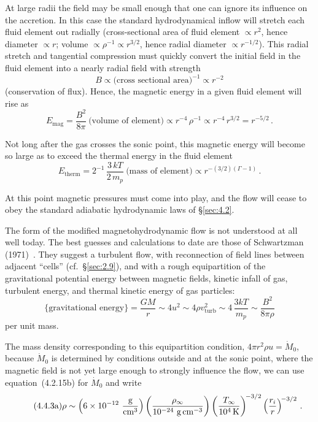 At large radii the field may be small enough that one can ignore its influence on
the accretion.  In this case the standard hydrodynamical inflow will stretch each
fluid element out radially (cross-sectional area of fluid element $\propto r^2$, hence
diameter $\propto r$; volume $\propto \rho^{-1} \propto r^{3/2}$, hence radial diameter $\propto r^{-1/2}$).
This radial stretch and tangential compression must quickly convert the initial
field in the fluid element into a nearly radial field with strength
%
\begin{equation}
\tag{4.4.2}
B \propto \text{(cross sectional area)}^{-1} \propto r^{-2}
\end{equation}
%
(conservation of flux).  Hence, the magnetic energy in a given fluid element will
rise as
%
\begin{equation}
\tag{4.4.3}
E_{\mathrm{mag}}
= \frac{B^2}{8\pi}~\text{(volume of element)}
\propto r^{-4}\,\rho^{-1}
\propto r^{-4}\,r^{3/2}
= r^{-5/2}\,.
\end{equation}

Not long after the gas crosses the sonic point, this magnetic energy will become
so large as to exceed the thermal energy in the fluid element
%
\begin{equation}
\tag{4.4.2a}
E_{\mathrm{therm}}
= 2^{-1}\,\frac{3\,kT}{2\,m_p}~\text{(mass of element)}
\propto r^{-(3/2)(\Gamma-1)}\,.
\end{equation}

At this point magnetic pressures must come into play, and the flow will cease
to obey the standard adiabatic hydrodynamic laws of \S\ref{sec:4.2}.

The form of the modified magnetohydrodynamic flow is not understood at
all well today.  The best guesses and calculations to date are those of Schwartzman
(1971)~\cite{Schwartzman1971}.  They suggest a turbulent flow, with reconnection of field lines between
adjacent ``cells'' (cf.\ \S\ref{sec:2.9}), and with a rough equipartition of the gravitational
potential energy between magnetic fields, kinetic infall of gas, turbulent energy,
and thermal kinetic energy of gas particles:
%
\begin{equation}
\tag{4.4.2b}
\bigl\{\text{gravitational energy}\bigr\}
= \frac{GM}{r}
\sim 4u^2
\sim 4\rho v_{\mathrm{turb}}^2
\sim 4\,\frac{3kT}{m_p}
\sim \frac{B^2}{8\pi\rho}
\end{equation}
%
per unit mass.

The mass density corresponding to this equipartition condition,
$4\pi r^2 \rho u = \dot{M}_0$, because $\dot{M}_0$ is determined by conditions
outside and at the sonic point, where the magnetic field is not yet large enough
to strongly influence the flow, we can use equation~(4.2.15b) for $\dot{M}_0$ and write
%
\begin{equation}
\tag{4.4.3a}
\rho
\sim \left(6 \times 10^{-12}~\frac{\text{g}}{\text{cm}^3}\right)
  \left(\frac{\rho_\infty}{10^{-24}~\text{g\,cm}^{-3}}\right)
  \left(\frac{T_\infty}{10^4\,\text{K}}\right)^{\!-3/2}
  \left(\frac{r_i}{r}\right)^{\!-3/2}\,.
\end{equation}

